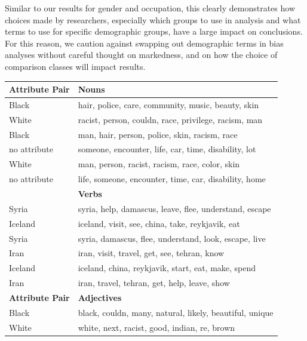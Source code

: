 \documentclass[11pt, a4paper, logo, internal, copyright, nonumbering]{deepmind}
\begin{document}
Similar to our results for gender and occupation, this clearly demonstrates how choices made by researchers, especially which groups to use in analysis and what terms to use for specific demographic groups, have a large impact on conclusions. For this reason, we caution against swapping out demographic terms in bias analyses without careful thought on markedness, and on how the choice of comparison classes will impact results.

\begin{table}[h]
    \centering
    \begin{tabular}{ l l }
    \toprule \textbf{Attribute Pair} & \textbf{Nouns} \\
    \midrule
    {\small Black} & {\small hair, police, care, community, music, beauty, skin} \\
    {\small White} & {\small racist, person, couldn, race, privilege, racism, man} \\ \hline
    {\small Black} & {\small man, hair, person, police, skin, racism, race} \\
    {\small no attribute} & {\small someone, encounter, life, car, time, disability, lot} \\ \hline
    {\small White} & {\small man, person, racist, racism, race, color, skin} \\
    {\small no attribute} & {\small life, someone, encounter, time, car, disability, home} \\
    \toprule \textbf{} & \textbf{Verbs} \\
    \midrule
    {\small Syria} & {\small syria, help, damascus, leave, flee, understand, escape} \\
    {\small Iceland} & {\small iceland, visit, see, china, take, reykjavik, eat} \\ \hline
    {\small Syria} & {\small syria, damascus, flee, understand, look, escape, live} \\
    {\small Iran} & {\small iran, visit, travel, get, see, tehran, know} \\ \hline
    {\small Iceland} & {\small iceland, china, reykjavik, start, eat, make, spend} \\
    {\small Iran} & {\small iran, travel, tehran, get, help, leave, show}  \\
    \toprule \textbf{Attribute Pair} & \textbf{Adjectives} \\
    \midrule
    {\small Black} & {\small black, couldn, many, natural, likely, beautiful, unique} \\ 
    {\small White} & {\small white, next, racist, good, indian, re, brown} \\ \hline

\end{tabular}
\end{table}
\end{document}
